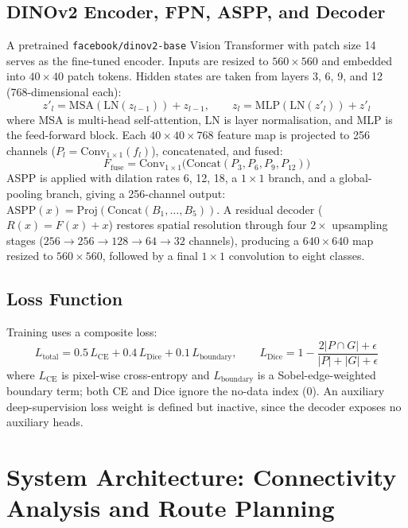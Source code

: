 \documentclass[runningheads]{llncs}
\begin{document}
\subsection{DINOv2 Encoder, FPN, ASPP, and Decoder}
A pretrained \texttt{facebook/dinov2-base} Vision Transformer with patch size 14 serves as the fine-tuned encoder. Inputs are resized to $560\times560$ and embedded into $40\times40$ patch tokens. Hidden states are taken from layers 3, 6, 9, and 12 (768-dimensional each):
\begin{equation}
z'_l=\mathrm{MSA}(\mathrm{LN}(z_{l-1}))+z_{l-1},\qquad z_l=\mathrm{MLP}(\mathrm{LN}(z'_l))+z'_l
\end{equation}
where MSA is multi-head self-attention, LN is layer normalisation, and MLP is the feed-forward block. Each $40\times40\times768$ feature map is projected to 256 channels ($P_l=\mathrm{Conv}_{1\times1}(f_l)$), concatenated, and fused:
\begin{equation}
F_{\mathrm{fuse}}=\mathrm{Conv}_{1\times1}\big(\mathrm{Concat}(P_3,P_6,P_9,P_{12})\big)
\end{equation}
ASPP is applied with dilation rates 6, 12, 18, a $1\times1$ branch, and a global-pooling branch, giving a 256-channel output: $\mathrm{ASPP}(x)=\mathrm{Proj}(\mathrm{Concat}(B_1,\dots,B_5))$. A residual decoder ($R(x)=F(x)+x$) restores spatial resolution through four $2\times$ upsampling stages ($256\to256\to128\to64\to32$ channels), producing a $640\times640$ map resized to $560\times560$, followed by a final $1\times1$ convolution to eight classes.

\subsection{Loss Function}
Training uses a composite loss:
\begin{equation}
L_{\mathrm{total}}=0.5\,L_{\mathrm{CE}}+0.4\,L_{\mathrm{Dice}}+0.1\,L_{\mathrm{boundary}},\qquad L_{\mathrm{Dice}}=1-\frac{2|P\cap G|+\epsilon}{|P|+|G|+\epsilon}
\end{equation}
where $L_{\mathrm{CE}}$ is pixel-wise cross-entropy and $L_{\mathrm{boundary}}$ is a Sobel-edge-weighted boundary term; both CE and Dice ignore the no-data index (0). An auxiliary deep-supervision loss weight is defined but inactive, since the decoder exposes no auxiliary heads.

\section{System Architecture: Connectivity Analysis and Route Planning}
\end{document}
